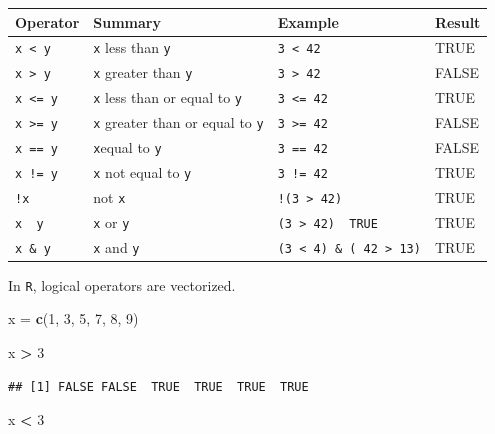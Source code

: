 \documentclass[]{book}
\newenvironment{Shaded}{\begin{snugshade}}{\end{snugshade}}
\newcommand{\KeywordTok}[1]{\textcolor[rgb]{0.13,0.29,0.53}{\textbf{#1}}}
\newcommand{\DecValTok}[1]{\textcolor[rgb]{0.00,0.00,0.81}{#1}}
\newcommand{\StringTok}[1]{\textcolor[rgb]{0.31,0.60,0.02}{#1}}
\newcommand{\OperatorTok}[1]{\textcolor[rgb]{0.81,0.36,0.00}{\textbf{#1}}}
\newcommand{\NormalTok}[1]{#1}
\theoremstyle{definition}
\theoremstyle{definition}
\theoremstyle{definition}
\theoremstyle{remark}
\begin{document}
\begin{longtable}[]{@{}llll@{}}
\toprule
Operator & Summary & Example & Result\tabularnewline
\midrule
\endhead
\texttt{x\ \textless{}\ y} & \texttt{x} less than \texttt{y} &
\texttt{3\ \textless{}\ 42} & TRUE\tabularnewline
\texttt{x\ \textgreater{}\ y} & \texttt{x} greater than \texttt{y} &
\texttt{3\ \textgreater{}\ 42} & FALSE\tabularnewline
\texttt{x\ \textless{}=\ y} & \texttt{x} less than or equal to
\texttt{y} & \texttt{3\ \textless{}=\ 42} & TRUE\tabularnewline
\texttt{x\ \textgreater{}=\ y} & \texttt{x} greater than or equal to
\texttt{y} & \texttt{3\ \textgreater{}=\ 42} & FALSE\tabularnewline
\texttt{x\ ==\ y} & \texttt{x}equal to \texttt{y} & \texttt{3\ ==\ 42} &
FALSE\tabularnewline
\texttt{x\ !=\ y} & \texttt{x} not equal to \texttt{y} &
\texttt{3\ !=\ 42} & TRUE\tabularnewline
\texttt{!x} & not \texttt{x} & \texttt{!(3\ \textgreater{}\ 42)} &
TRUE\tabularnewline
\texttt{x\ \textbar{}\ y} & \texttt{x} or \texttt{y} &
\texttt{(3\ \textgreater{}\ 42)\ \textbar{}\ TRUE} & TRUE\tabularnewline
\texttt{x\ \&\ y} & \texttt{x} and \texttt{y} &
\texttt{(3\ \textless{}\ 4)\ \&\ (\ 42\ \textgreater{}\ 13)} &
TRUE\tabularnewline
\bottomrule
\end{longtable}

In \texttt{R}, logical operators are vectorized.

\begin{Shaded}
\begin{Highlighting}[]
\NormalTok{x =}\StringTok{ }\KeywordTok{c}\NormalTok{(}\DecValTok{1}\NormalTok{, }\DecValTok{3}\NormalTok{, }\DecValTok{5}\NormalTok{, }\DecValTok{7}\NormalTok{, }\DecValTok{8}\NormalTok{, }\DecValTok{9}\NormalTok{)}
\end{Highlighting}
\end{Shaded}

\begin{Shaded}
\begin{Highlighting}[]
\NormalTok{x }\OperatorTok{>}\StringTok{ }\DecValTok{3}
\end{Highlighting}
\end{Shaded}

\begin{verbatim}
## [1] FALSE FALSE  TRUE  TRUE  TRUE  TRUE
\end{verbatim}

\begin{Shaded}
\begin{Highlighting}[]
\NormalTok{x }\OperatorTok{<}\StringTok{ }\DecValTok{3}
\end{Highlighting}
\end{Shaded}
\end{document}
